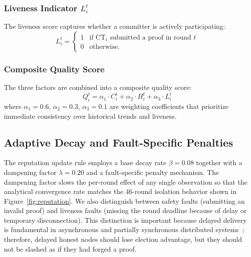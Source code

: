 \documentclass[journal]{IEEEtran}
\begin{document}
\subsubsection{Liveness Indicator \texorpdfstring{$L_i^t$}{Lit}}
The liveness score captures whether a committer is actively participating:
\begin{equation}
L_i^t = \begin{cases} 1 & \text{if CT}_i \text{ submitted a proof in round } t \\ 0 & \text{otherwise.} \end{cases}
\label{eq:liveness}
\end{equation}

\subsubsection{Composite Quality Score}
The three factors are combined into a composite quality score:
\begin{equation}
Q_i^t = \alpha_1 \cdot C_i^t + \alpha_2 \cdot H_i^t + \alpha_3 \cdot L_i^t
\label{eq:quality}
\end{equation}
where $\alpha_1 = 0.6$, $\alpha_2 = 0.3$, $\alpha_3 = 0.1$ are weighting coefficients that prioritize immediate consistency over historical trends and liveness.

\subsection{Adaptive Decay and Fault-Specific Penalties}

The reputation update rule employs a base decay rate $\beta = 0.08$ together with a dampening factor $\lambda = 0.20$ and a fault-specific penalty mechanism. The dampening factor slows the per-round effect of any single observation so that the analytical convergence rate matches the 46-round isolation behavior shown in Figure~\ref{fig:reputation}. We also distinguish between {safety faults} (submitting an invalid proof) and {liveness faults} (missing the round deadline because of delay or temporary disconnection). This distinction is important because delayed delivery is fundamental in asynchronous and partially synchronous distributed systems~\cite{fischer1985impossibility,miller2016honeybadger}; therefore, delayed honest nodes should lose election advantage, but they should not be slashed as if they had forged a proof.
\end{document}
